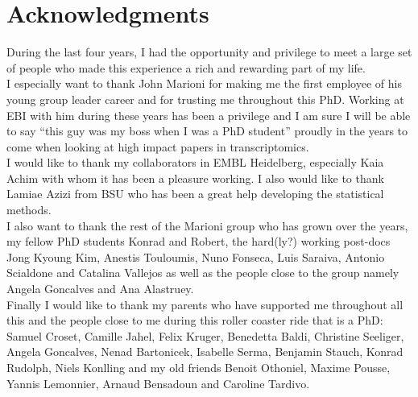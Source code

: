 
\bigskip

\begingroup
\let\clearpage\relax
\let\cleardoublepage\relax
\let\cleardoublepage\relax
\chapter*{Acknowledgments}
During the last four years, I had the opportunity and privilege to meet a large set of people who made this experience a rich and rewarding part of my life.\\

I especially want to thank John Marioni for making me the first employee of his young group leader career and for trusting me throughout this PhD. Working at EBI with him during these years has been a privilege and I am sure I will be able to say ``this guy was my boss when I was a PhD student'' proudly in the years to come when looking at high impact papers in transcriptomics.\\

I would like to thank my collaborators in EMBL Heidelberg, especially Kaia Achim with whom it has been a pleasure working. I also would like to thank Lamiae Azizi from BSU who has been a great help developing the statistical methods.\\

I also want to thank the rest of the Marioni group who has grown over the years, my fellow PhD students Konrad and Robert, the hard(ly?) working post-docs Jong Kyoung Kim, Anestis Touloumis, Nuno Fonseca, Luis Saraiva, Antonio Scialdone and Catalina Vallejos as well as the people close to the group namely Angela Goncalves and Ana Alastruey.\\

Finally I would like to thank my parents who have supported me throughout all this and the people close to me during this roller coaster ride that is a PhD: Samuel Croset, Camille Jahel, Felix Kruger, Benedetta Baldi, Christine Seeliger, Angela Goncalves, Nenad Bartonicek, Isabelle Serma, Benjamin Stauch, Konrad Rudolph, Niels Konlling and my old friends Benoit Othoniel, Maxime Pousse, Yannis Lemonnier, Arnaud Bensadoun and Caroline Tardivo.



\bigskip



\endgroup



